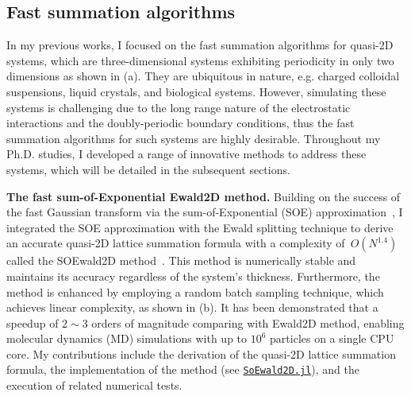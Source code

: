 
\subsection{Fast summation algorithms}

In my previous works, I focused on the fast summation algorithms for quasi-2D systems, which are three-dimensional systems exhibiting periodicity in only two dimensions as shown in  (a).
They are ubiquitous in nature, e.g. charged colloidal suspensions, liquid crystals, and biological systems.
However, simulating these systems is challenging due to the long range nature of the electrostatic interactions and the doubly-periodic boundary conditions, thus the fast summation algorithms for such systems are highly desirable.
Throughout my Ph.D. studies, I developed a range of innovative methods to address these systems, which will be detailed in the subsequent sections.

\textbf{The fast sum-of-Exponential Ewald2D method.}
Building on the success of the fast Gaussian transform via the sum-of-Exponential (SOE) approximation~\cite{Greengard2022ApproximatingTG}, I integrated the SOE approximation with the Ewald splitting technique to derive an accurate quasi-2D lattice summation formula with a complexity of~$O(N^{1.4})$ called the SOEwald2D method~\cite{gan2024fast}. 
This method is numerically stable and maintains its accuracy regardless of the system's thickness. 
Furthermore, the method is enhanced by employing a random batch sampling technique, which achieves linear complexity, as shown in  (b).
It has been demonstrated that a speedup of $2 \sim 3$ orders of magnitude comparing with Ewald2D method, enabling molecular dynamics (MD) simulations with up to $10^6$ particles on a single CPU core.
My contributions include the derivation of the quasi-2D lattice summation formula, the implementation of the method (see \href{https://github.com/HPMolSim/SoEwald2D.jl}{\texttt{SoEwald2D.jl}}), and the execution of related numerical tests.


